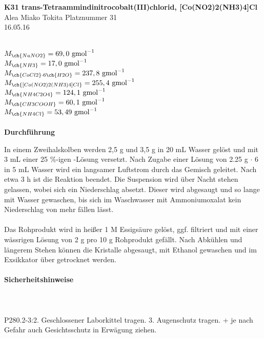 \documentclass[12pt,a4paper,titlepage,headinclude,bibtotoc]{scrartcl}
\begin{document}
\textbf{K31 trans-Tetraammindinitrocobalt(III)chlorid, [Co(NO2)2(NH3)4]Cl}\\


Alea Miako Tokita Platznummer 31\\
16.05.16\\\\
\vspace{2cm}

$M_{\ch{NaNO2}} = 69,0~\mathrm{gmol}^{-1} $\\
$M_{\ch{NH3}} = 17,0~\mathrm{gmol}^{-1} $\\
$M_{\ch{CoCl2} \cdot 6\ch{H2O}} = 237,8~\mathrm{gmol}^{-1} $\\
$M_{\ch{[Co(NO2)2(NH3)4]Cl}} = 255,4~\mathrm{gmol}^{-1} $\\
$M_{\ch{NH4C2O4}} = 124,1~\mathrm{gmol}^{-1} $\\
$M_{\ch{CH3COOH}} = 60,1~\mathrm{gmol}^{-1} $\\
$M_{\ch{NH4Cl}} = 53,49 ~\mathrm{gmol}^{-1} $\\\\

\textbf{Durchführung}

In  einem  Zweihalskolben  werden  2,5 g    und  3,5 g   in  20 mL  Wasser gelöst  und  mit  3 mL  einer  25 \%-igen   -Lösung  versetzt.  Nach  Zugabe  einer
Lösung  von  2.25 g  $\cdot$ 6  in  5 mL  Wasser wird  ein  langsamer  Luftstrom durch das Gemisch geleitet. Nach etwa 3 h ist die Reaktion beendet. Die Suspension wird über Nacht stehen gelassen, wobei sich ein Niederschlag absetzt. Dieser wird abgesaugt und so lange mit Wasser gewaschen, bis sich im Waschwasser mit Ammoniumoxalat kein Niederschlag von  mehr fällen lässt.\\\\
Das Rohprodukt wird in heißer 1 M Essigsäure gelöst, ggf. filtriert und mit einer wässrigen  Lösung  von  2 g   pro  10 g  Rohprodukt  gefällt.  Nach  Abkühlen und längerem Stehen können die Kristalle abgesaugt, mit Ethanol gewaschen und im Exsikkator über  getrocknet werden.\\\\

\textbf{Sicherheitshinweise}\\

\textbf{}\\
\\
\\  
P280.2-3:2. Geschlossener Laborkittel tragen.
3. Augenschutz tragen. + je nach Gefahr auch Gesichtsschutz in Erwägung ziehen.\\
\\ 
\\
\\
 \\\\
\end{document}
